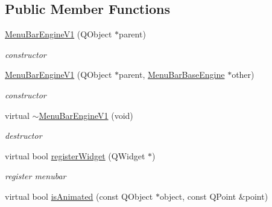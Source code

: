 \subsection*{Public Member Functions}
\begin{DoxyCompactItemize}
\item 
\mbox{\label{class_menu_bar_engine_v1_a79da2e2d091bc39ea5d6ece55771d3c3}} 
\hyperlink{class_menu_bar_engine_v1_a79da2e2d091bc39ea5d6ece55771d3c3}{Menu\+Bar\+Engine\+V1} (Q\+Object $\ast$parent)
\begin{DoxyCompactList}\small\item\em constructor \end{DoxyCompactList}\item 
\mbox{\label{class_menu_bar_engine_v1_aae251c3b35adcef0964986abeb0352a6}} 
\hyperlink{class_menu_bar_engine_v1_aae251c3b35adcef0964986abeb0352a6}{Menu\+Bar\+Engine\+V1} (Q\+Object $\ast$parent, \hyperlink{class_menu_bar_base_engine}{Menu\+Bar\+Base\+Engine} $\ast$other)
\begin{DoxyCompactList}\small\item\em constructor \end{DoxyCompactList}\item 
\mbox{\label{class_menu_bar_engine_v1_aec1b103b59f0547f3f6eacad1e2896e0}} 
virtual \hyperlink{class_menu_bar_engine_v1_aec1b103b59f0547f3f6eacad1e2896e0}{$\sim$\+Menu\+Bar\+Engine\+V1} (void)
\begin{DoxyCompactList}\small\item\em destructor \end{DoxyCompactList}\item 
\mbox{\label{class_menu_bar_engine_v1_afe506ee841911915659dfd31a0dcb39e}} 
virtual bool \hyperlink{class_menu_bar_engine_v1_afe506ee841911915659dfd31a0dcb39e}{register\+Widget} (Q\+Widget $\ast$)
\begin{DoxyCompactList}\small\item\em register menubar \end{DoxyCompactList}\item 
\mbox{\label{class_menu_bar_engine_v1_aadcfa258354b1c52bb3e3b8f57c33452}} 
virtual bool \hyperlink{class_menu_bar_engine_v1_aadcfa258354b1c52bb3e3b8f57c33452}{is\+Animated} (const Q\+Object $\ast$object, const Q\+Point \&point)

\end{DoxyCompactItemize}
